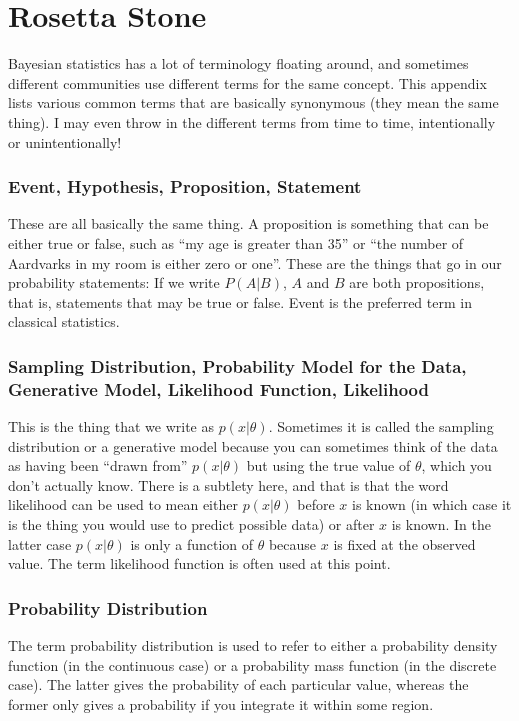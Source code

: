 \chapter{Rosetta Stone}
Bayesian statistics has a lot of terminology floating around, and sometimes
different communities use different terms for the same concept. This appendix
lists various common terms that are basically synonymous (they mean the same thing).
I may even throw in the different terms from time to time, intentionally or
unintentionally!

\subsection*{Event, Hypothesis, Proposition, Statement}
These are all basically the same thing.
A proposition is something that can be either true or false, such as ``my age is
greater than 35'' or ``the number of Aardvarks in my room is either zero or
one''. These are the things that go in our
probability statements: If we write $P(A|B)$, $A$ and $B$ are both propositions,
that is, statements that may be true or false. Event is the preferred term in
classical statistics.


\subsection*{Sampling Distribution, Probability Model for the Data,
Generative Model, Likelihood Function, Likelihood}
This is the thing that we
write as $p(x|\theta)$. Sometimes it is called the sampling distribution or
a generative model because
you can sometimes think of the data as having been ``drawn from''
$p(x|\theta)$ but using the true value of $\theta$, which you don't actually
know. There is a subtlety here, and that is that the word likelihood can be
used to mean either $p(x|\theta)$ before $x$ is known (in which case it is the
thing you would use to predict possible data) or after $x$ is known. In the latter
case $p(x|\theta)$ is only a function of $\theta$ because $x$ is fixed at the
observed value. The term likelihood function is often used at this point.

\subsection*{Probability Distribution}
The term probability distribution is used to refer to either a probability density
function (in the continuous case) or a probability mass function (in the discrete
case). The latter gives the probability of each particular value, whereas the
former only gives a probability if you integrate it within some region.


